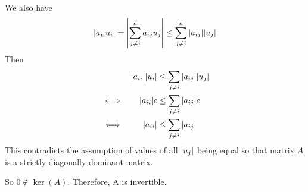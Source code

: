 \documentclass{article}
\begin{document}
We also have 
$$
\abs{a_{ii}u_i} =  \abs{\sum_{j\neq i}^n a_{ij}u_j} \leq \sum_{j\neq i}^n \abs{a_{ij}}\abs{u_j}
$$
Then
\begin{equation*}
    \begin{aligned}
        & &\abs{a_{ii}} \abs{u_i} &\leq \sum_{j\neq i}\abs{a_{ij}}\abs{u_j} \\
        &\iff &\abs{a_{ii}} c &\leq \sum_{j\neq i}\abs{a_{ij}}c \\
        &\iff &\abs{a_{ii}} &\leq \sum_{j\neq i}\abs{a_{ij}}
    \end{aligned}
\end{equation*}
This contradicts the assumption of values of all $\abs{u_j}$ being equal so that matrix $A$ is a strictly diagonally dominant matrix.


So $0 \not\in \ker(A)$. Therefore, A is invertible.
\end{document}
